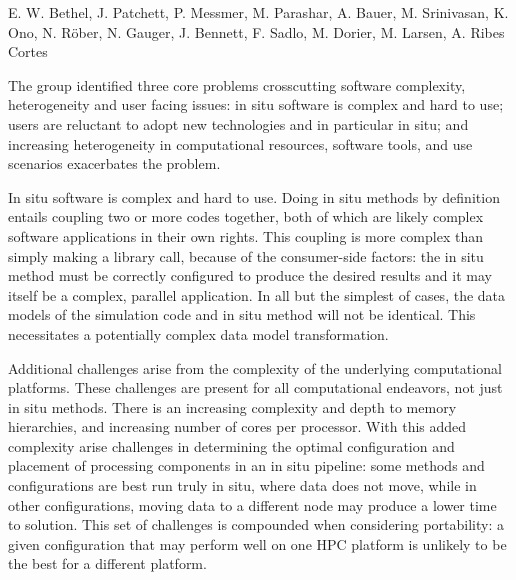 
\license

 E. W. Bethel, J. Patchett, P. Messmer, M. Parashar, A. Bauer, M. Srinivasan, K. Ono, N. Röber, N. Gauger, J. Bennett, F. Sadlo, M. Dorier, M. Larsen, A. Ribes Cortes

\begin{refsection}

The group identified three core problems crosscutting software complexity, heterogeneity and user facing issues: in situ software is complex and hard to use; users are reluctant to adopt new technologies and in particular in situ; and increasing heterogeneity in computational resources, software tools, and use scenarios exacerbates the problem. 

In situ software is complex and hard to use. 
Doing in situ methods by definition entails coupling two or more codes together, both of which are likely complex software applications in their own rights. 
This coupling is more complex than simply making a library call, because of the consumer-side factors: the in situ method must be correctly configured to produce the desired results and it may itself be a complex, parallel application. 
In all but the simplest of cases, the data models of the simulation code and in situ method will not be identical.
This necessitates a potentially complex data model transformation.

Additional challenges arise from the complexity of the underlying computational platforms.
These challenges are present for all computational endeavors, not just in situ methods. 
There is an increasing complexity and depth to memory hierarchies, and increasing number of cores per processor. 
With this added complexity arise challenges in determining the optimal configuration and placement of processing components in an in situ pipeline: some methods and configurations are best run truly in situ, where data does not move, while in other configurations, moving data to a different node may produce a lower time to solution. 
This set of challenges is compounded when considering portability: a given configuration that may perform well on one HPC platform is unlikely to be the best for a different platform.


\end{refsection}

